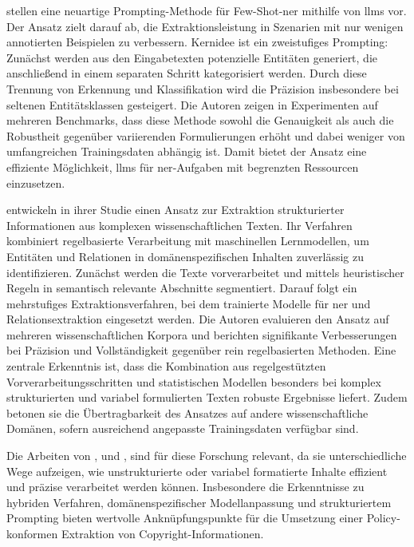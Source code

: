 \citeauthor{cheng_novel_2024}\autocite{cheng_novel_2024} stellen eine neuartige Prompting-Methode für Few-Shot-\gls{ner} mithilfe von \glspl{llm} vor.
Der Ansatz zielt darauf ab, die Extraktionsleistung in Szenarien mit nur wenigen annotierten Beispielen zu verbessern.
Kernidee ist ein zweistufiges Prompting: Zunächst werden aus den Eingabetexten potenzielle Entitäten generiert, die anschließend in einem separaten Schritt kategorisiert werden.
Durch diese Trennung von Erkennung und Klassifikation wird die Präzision insbesondere bei seltenen Entitätsklassen gesteigert.
Die Autoren zeigen in Experimenten auf mehreren Benchmarks, dass diese Methode sowohl die Genauigkeit als auch die Robustheit gegenüber variierenden Formulierungen erhöht und dabei weniger von umfangreichen Trainingsdaten abhängig ist.
Damit bietet der Ansatz eine effiziente Möglichkeit, \glspl{llm} für \gls{ner}-Aufgaben mit begrenzten Ressourcen einzusetzen\autocite{cheng_novel_2024}.

\citeauthor{dunn_structured_2022}\autocite{dunn_structured_2022} entwickeln in ihrer Studie einen Ansatz zur Extraktion strukturierter Informationen aus komplexen wissenschaftlichen Texten.
Ihr Verfahren kombiniert regelbasierte Verarbeitung mit maschinellen Lernmodellen, um Entitäten und Relationen in domänenspezifischen Inhalten zuverlässig zu identifizieren.
Zunächst werden die Texte vorverarbeitet und mittels heuristischer Regeln in semantisch relevante Abschnitte segmentiert.
Darauf folgt ein mehrstufiges Extraktionsverfahren, bei dem trainierte Modelle für \gls{ner} und Relationsextraktion eingesetzt werden.
Die Autoren evaluieren den Ansatz auf mehreren wissenschaftlichen Korpora und berichten signifikante Verbesserungen bei Präzision und Vollständigkeit gegenüber rein regelbasierten Methoden.
Eine zentrale Erkenntnis ist, dass die Kombination aus regelgestützten Vorverarbeitungsschritten und statistischen Modellen besonders bei komplex strukturierten und variabel formulierten Texten robuste Ergebnisse liefert.
Zudem betonen sie die Übertragbarkeit des Ansatzes auf andere wissenschaftliche Domänen, sofern ausreichend angepasste Trainingsdaten verfügbar sind\autocite{dunn_structured_2022}.

Die Arbeiten von \textcite{breton_empowering_2024}\autocite{breton_empowering_2024}, \textcite{cheng_novel_2024}\autocite{cheng_novel_2024} und \textcite{dunn_structured_2022}\autocite{dunn_structured_2022}, sind für diese Forschung relevant, da sie unterschiedliche Wege aufzeigen, wie unstrukturierte oder variabel formatierte Inhalte effizient und präzise verarbeitet werden können.
Insbesondere die Erkenntnisse zu hybriden Verfahren, domänenspezifischer Modellanpassung und strukturiertem Prompting bieten wertvolle Anknüpfungspunkte für die Umsetzung einer Policy-konformen Extraktion von Copyright-Informationen.